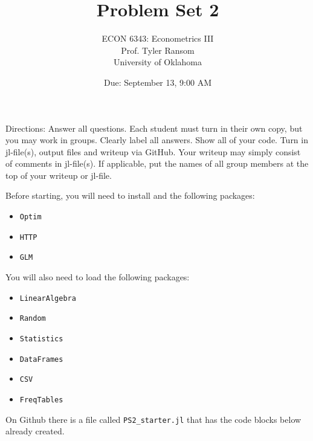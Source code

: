 \documentclass[12pt,english]{article}
\begin{document}
\title{Problem Set 2}
\author{ECON 6343: Econometrics III\\
Prof. Tyler Ransom\\
University of Oklahoma}
\date{Due: September 13, 9:00 AM}

\maketitle
Directions: Answer all questions. Each student must turn in their own copy, but you may work in groups. Clearly label all answers. Show all of your code. Turn in jl-file(s), output files and writeup via GitHub. Your writeup may simply consist of comments in jl-file(s). If applicable, put the names of all group members at the top of your writeup or jl-file.


Before starting, you will need to install and the following packages:
\begin{itemize}
    \item[~] \texttt{Optim} 
    \item[~] \texttt{HTTP} 
    \item[~] \texttt{GLM} 
\end{itemize}

You will also need to load the following packages:
\begin{itemize}
    \item[~] \texttt{LinearAlgebra} 
    \item[~] \texttt{Random} 
    \item[~] \texttt{Statistics} 
    \item[~] \texttt{DataFrames} 
    \item[~] \texttt{CSV} 
    \item[~] \texttt{FreqTables}
\end{itemize}

On Github there is a file called \texttt{PS2\_starter.jl} that has the code blocks below already created.
\end{document}
